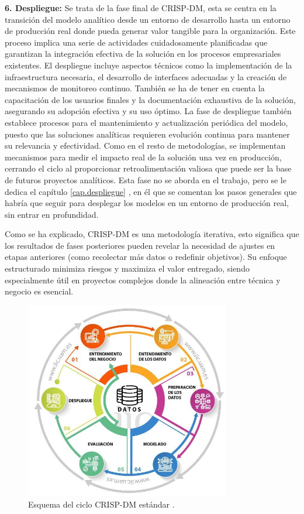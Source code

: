 \textbf{6. Despliegue:} Se trata de la fase final de CRISP-DM, esta se centra en la transición del modelo analítico desde un entorno de desarrollo hasta un entorno de producción real donde pueda generar valor tangible para la organización. Este proceso implica una serie de actividades cuidadosamente planificadas que garantizan la integración efectiva de la solución en los procesos empresariales existentes. El despliegue incluye aspectos técnicos como la implementación de la infraestructura necesaria, el desarrollo de interfaces adecuadas y la creación de mecanismos de monitoreo continuo. También se ha de tener en cuenta la capacitación de los usuarios finales y la documentación exhaustiva de la solución, asegurando su adopción efectiva y su uso óptimo. La fase de despliegue también establece procesos para el mantenimiento y actualización periódica del modelo, puesto que las soluciones analíticas requieren evolución continua para mantener su relevancia y efectividad. Como en el resto de metodologías, se implementan mecanismos para medir el impacto real de la solución una vez en producción, cerrando el ciclo al proporcionar retroalimentación valiosa que puede ser la base de futuros proyectos analíticos. Esta fase no se aborda en el trabajo, pero se le dedica el capítulo \ref{cap.despliegue} , en él que se comentan los pasos generales que habría que seguir para desplegar los modelos en un entorno de producción real, sin entrar en profundidad.

Como se ha explicado, CRISP-DM es una metodología iterativa, esto significa que los resultados de fases posteriores pueden revelar la necesidad de ajustes en etapas anteriores (como recolectar más datos o redefinir objetivos). Su enfoque estructurado minimiza riesgos y maximiza el valor entregado, siendo especialmente útil en proyectos complejos donde la alineación entre técnica y negocio es esencial.

\begin{figure}[H]
    \centering
    \includegraphics[width=0.8\textwidth]{./img/metodologia/crispdm.jpeg}
    \caption{Esquema del ciclo CRISP-DM estándar \cite{haya_crisp_dm}.}
    \label{fig:CRISP-DM}
\end{figure}

